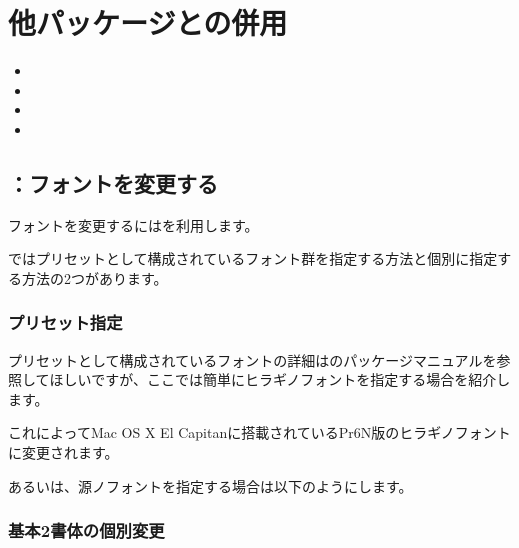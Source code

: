 \documentclass[../supplement]{subfiles}
\begin{document}
\section{他パッケージとの併用}

\begin{itemize}
  \item {}
  \item {}
  \item {}
  \item {}
\end{itemize}

\subsection{\texorpdfstring{}{pxchfonパッケージ}：フォントを変更する}

フォントを変更するにはを利用します。

ではプリセットとして構成されているフォント群を指定する方法と個別に指定する方法の2つがあります。

\subsubsection{プリセット指定}

プリセットとして構成されているフォントの詳細はのパッケージマニュアルを参照してほしいですが、ここでは簡単にヒラギノフォントを指定する場合を紹介します。

\begin{texsource}
\usepackage[noalphabet, hiragino-elcapitan-pron]{pxchfon}
\end{texsource}

これによってMac OS X El Capitanに搭載されているPr6N版のヒラギノフォントに変更されます。

あるいは、源ノフォントを指定する場合は以下のようにします。

\begin{texsource}
\usepackage[noalphabet, sourcehan, unicode]{pxchfon}
\end{texsource}

\subsubsection{基本2書体の個別変更}
\end{document}
